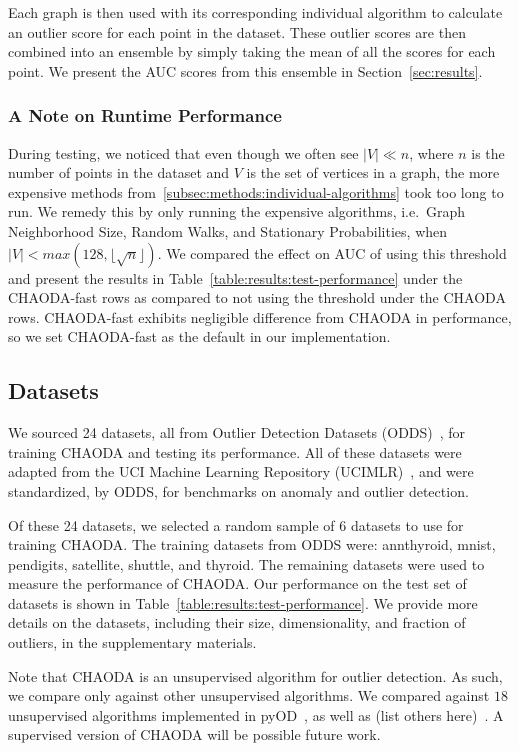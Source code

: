 Each graph is then used with its corresponding individual algorithm to calculate an outlier score for each point in the dataset.
These outlier scores are then combined into an ensemble by simply taking the mean of all the scores for each point.
We present the AUC scores from this ensemble in Section~\ref{sec:results}.

\subsubsection{A Note on Runtime Performance}

During testing, we noticed that even though we often see $|V| \ll n $, where $n$ is the number of points in the dataset and $V$ is the set of vertices in a graph, the more expensive methods from~\ref{subsec:methods:individual-algorithms} took too long to run.
We remedy this by only running the expensive algorithms, i.e.\ Graph Neighborhood Size, Random Walks, and Stationary Probabilities, when $|V| < max(128, \lfloor \sqrt n \rfloor)$.
We compared the effect on AUC of using this threshold and present the results in Table~\ref{table:results:test-performance} under the CHAODA-fast rows as compared to not using the threshold under the CHAODA rows.
CHAODA-fast exhibits negligible difference from CHAODA in performance, so we
set CHAODA-fast as the default in our implementation.


\subsection{Datasets}
\label{subsec:methods:datasets}

We sourced 24 datasets, all from Outlier Detection Datasets (ODDS)~\cite{rayana2016odds}, for training CHAODA and testing its performance.
All of these datasets were adapted from the UCI Machine Learning Repository (UCIMLR)~\cite{UCIMLR}, and were standardized, by ODDS, for benchmarks on anomaly and outlier detection.


Of these 24 datasets, we selected a random sample of 6 datasets to use for training CHAODA\@.
The training datasets from ODDS were: annthyroid, mnist, pendigits, satellite, shuttle, and thyroid.
The remaining datasets were used to measure the performance of CHAODA\@.
Our performance on the test set of datasets is shown in Table~\ref{table:results:test-performance}.
We provide more details on the datasets, including their size, dimensionality, and fraction of outliers, in the supplementary materials.

Note that CHAODA is an unsupervised algorithm for outlier detection.
As such, we compare only against other unsupervised algorithms. %
We compared against $18$ unsupervised algorithms implemented in pyOD~\cite{zhao2019pyod}, as well as (list others here)~\cite{}. %
A supervised version of CHAODA will be possible future work.
